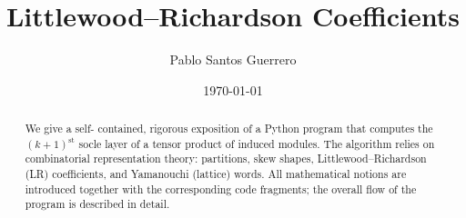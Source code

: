\documentclass[a4paper,12pt]{article}
\title{Littlewood--Richardson Coefficients}
\author{Pablo Santos Guerrero}
\date{\today}
\begin{document}
\maketitle
\begin{abstract}
We give a self- contained, rigorous exposition of a Python program that computes the
\((k\!+\!1)^{\text{st}}\) socle layer of a tensor product of induced modules.
The algorithm relies on combinatorial representation theory:
partitions, skew shapes, Littlewood--Richardson (LR) coefficients, and
Yamanouchi (lattice) words.  
All mathematical notions are introduced together with the corresponding
code fragments; the overall flow of the program is described in detail.
\end{abstract}

\tableofcontents
\newpage

\renewcommand{\arraystretch}{1.6} 
\end{document}
